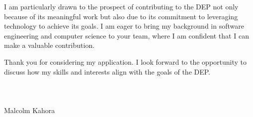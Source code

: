 \documentclass[letterpaper,11pt]{article}
\begin{document}
I am particularly drawn to the prospect of contributing to the DEP not only because of its meaningful work but also due to its commitment to leveraging technology to achieve its goals. I am eager to bring my background in software engineering and computer science to your team, where I am confident that I can make a valuable contribution.


Thank you for considering my application. I look forward to the opportunity to discuss how my skills and interests align with the goals of the DEP. \\
\\
\\
\\
\vspace{50pt}
Malcolm Kahora
\end{document}
